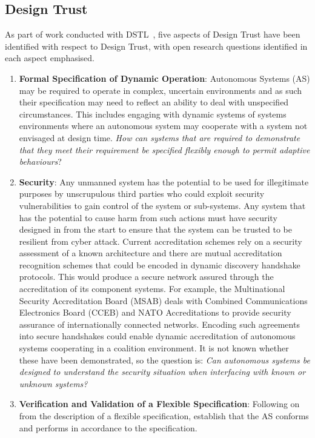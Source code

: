 \subsection{Design Trust}\label{sec:design_trust}

As part of work conducted with DSTL~\cite{Bolster2014a}, five aspects of Design Trust have been identified with respect to Design Trust, with open research questions identified in each aspect emphasised.

\begin{enumerate}
  \item \textbf{Formal Specification of Dynamic Operation}: Autonomous Systems (AS) may be required to operate in complex, uncertain environments and as such their specification may need to reflect an ability to deal with unspecified circumstances.
    This includes engaging with dynamic systems of systems environments where an autonomous system may cooperate with a system not envisaged at design time.
    \textit{How can systems that are required to demonstrate that they meet their requirement be specified flexibly enough to permit adaptive behaviours}?
  \item \textbf{Security}: Any unmanned system has the potential to be used for illegitimate purposes by unscrupulous third parties who could exploit security vulnerabilities to gain control of the system or sub-systems.
    Any system that has the potential to cause harm from such actions must have security designed in from the start to ensure that the system can be trusted to be resilient from cyber attack.
    Current accreditation schemes rely on a security assessment of a known architecture and there are mutual accreditation recognition schemes that could be encoded in dynamic discovery handshake protocols.
    This would produce a secure network assured through the accreditation of its component systems.
    For example, the Multinational Security Accreditation Board (MSAB) deals with Combined Communications Electronics Board (CCEB) and NATO Accreditations to provide security assurance of internationally connected networks.
    Encoding such agreements into secure handshakes could enable dynamic accreditation of autonomous systems cooperating in a coalition environment.
    It is not known whether these have been demonstrated, so the question is: \textit{Can autonomous systems be designed to understand the security situation when interfacing with known or unknown systems?}
  \item \textbf{Verification and Validation of a Flexible Specification}: Following on from the description of a flexible specification, establish that the AS conforms and performs in accordance to the specification.

\end{enumerate}
